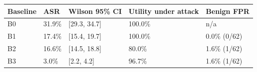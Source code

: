 \begin{tabular}{lllll}\toprule Baseline & ASR & Wilson 95\% CI & Utility under attack & Benign FPR \\\midrule
B0 & 31.9\% & [29.3, 34.7] & 100.0\% & n/a \\
B1 & 17.4\% & [15.4, 19.7] & 100.0\% & 0.0\% (0/62) \\
B2 & 16.6\% & [14.5, 18.8] & 80.0\% & 1.6\% (1/62) \\
B3 & 3.0\% & [2.2, 4.2] & 96.7\% & 1.6\% (1/62) \\
\bottomrule\end{tabular}
